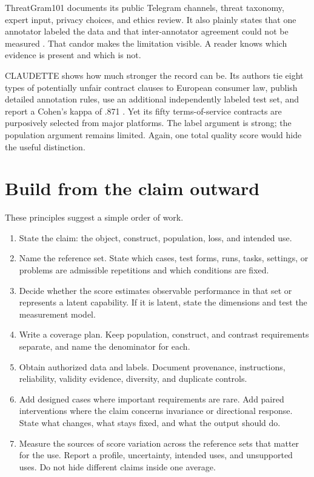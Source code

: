 \documentclass[11pt]{article}
\begin{document}
ThreatGram101 documents its public Telegram channels, threat taxonomy, expert input, privacy choices, and ethics review. It also plainly states that one annotator labeled the data and that inter-annotator agreement could not be measured \citep{ravi2025threatgram}. That candor makes the limitation visible. A reader knows which evidence is present and which is not.

CLAUDETTE shows how much stronger the record can be. Its authors tie eight types of potentially unfair contract clauses to European consumer law, publish detailed annotation rules, use an additional independently labeled test set, and report a Cohen's kappa of .871 \citep{lippi2019claudette}. Yet its fifty terms-of-service contracts are purposively selected from major platforms. The label argument is strong; the population argument remains limited. Again, one total quality score would hide the useful distinction.

\section*{Build from the claim outward}

These principles suggest a simple order of work.

\begin{enumerate}
  \item State the claim: the object, construct, population, loss, and intended use.
  \item Name the reference set. State which cases, test forms, runs, tasks, settings, or problems are admissible repetitions and which conditions are fixed.
  \item Decide whether the score estimates observable performance in that set or represents a latent capability. If it is latent, state the dimensions and test the measurement model.
  \item Write a coverage plan. Keep population, construct, and contrast requirements separate, and name the denominator for each.
  \item Obtain authorized data and labels. Document provenance, instructions, reliability, validity evidence, diversity, and duplicate controls.
  \item Add designed cases where important requirements are rare. Add paired interventions where the claim concerns invariance or directional response. State what changes, what stays fixed, and what the output should do.
  \item Measure the sources of score variation across the reference sets that matter for the use. Report a profile, uncertainty, intended uses, and unsupported uses. Do not hide different claims inside one average.
\end{enumerate}
\end{document}
